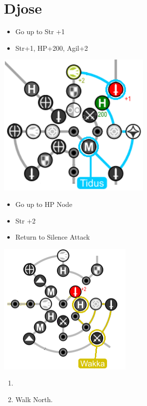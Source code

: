 \chapter{Djose}

\begin{spheregrid}
  \begin{itemize}
    \tidusf
    \begin{itemize}
      \item Go up to Str +1
      \item Str+1, HP+200, Agil+2
    \end{itemize}
    \includegraphics{graphics/djosetidus}
    \wakkaf
    \begin{itemize}
      \item Go up to HP Node
      \item Str +2
      \item Return to Silence Attack
    \end{itemize}
    \includegraphics{graphics/djosewakka}
  \end{itemize}
\end{spheregrid}
\begin{enumerate}
  \item \formation{\tidus}{\yuna}{\auron}
  \item Walk North.
\end{enumerate}
